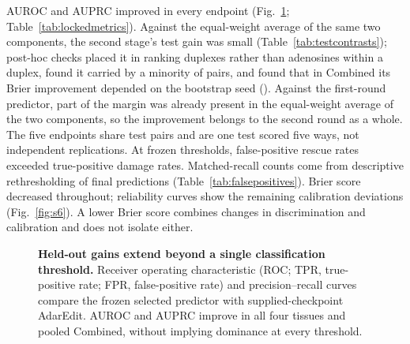 \documentclass[9pt,twoside]{pnas-new}
\begin{document}


AUROC and AUPRC improved in every endpoint (Fig.~\ref{fig:s5}; Table~\ref{tab:lockedmetrics}). Against the equal-weight average of the same two components, the second stage's test gain was small (Table~\ref{tab:testcontrasts}); post-hoc checks placed it in ranking duplexes rather than adenosines within a duplex, found it carried by a minority of pairs, and found that in Combined its Brier improvement depended on the bootstrap seed (). Against the first-round predictor, part of the margin was already present in the equal-weight average of the two components, so the improvement belongs to the second round as a whole. The five endpoints share test pairs and are one test scored five ways, not independent replications. At frozen thresholds, false-positive rescue rates exceeded true-positive damage rates. Matched-recall counts come from descriptive rethresholding of final predictions (Table~\ref{tab:falsepositives}). Brier score decreased throughout; reliability curves show the remaining calibration deviations (Fig.~\ref{fig:s6}). A lower Brier score combines changes in discrimination and calibration and does not isolate either.



\begin{figure}[H]
\centering

\caption{\textbf{Held-out gains extend beyond a single classification threshold.} Receiver operating characteristic (ROC; TPR, true-positive rate; FPR, false-positive rate) and precision--recall curves compare the frozen selected predictor with supplied-checkpoint AdarEdit. AUROC and AUPRC improve in all four tissues and pooled Combined, without implying dominance at every threshold.}
\label{fig:s5}
\end{figure}

\begingroup\centering

\label{fig:s6}
\par\endgroup
\end{document}
